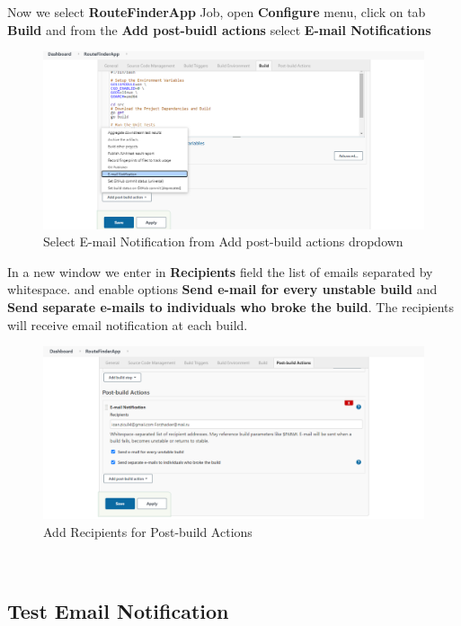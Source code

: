 \documentclass[12pt,a4paper,twoside]{article}
\begin{document}
Now we select \textbf{RouteFinderApp} Job, open \textbf{Configure} menu, click on tab \textbf{Build} and from the \textbf{Add post-buidl actions} select \textbf{E-mail Notifications}


\begin{figure}[H]
    \centering
        \includegraphics[width=15cm]{images-aws/55-email-notification-buil-setting.png}
        \caption{Select E-mail Notification from Add post-build actions dropdown}
\end{figure}


In a new window we enter in \textbf{Recipients} field the list of emails separated by whitespace. and enable options \textbf{Send e-mail for every unstable build} and \textbf{Send separate e-mails to individuals who broke the build}.
The recipients will receive email notification at each build.


\begin{figure}[H]
    \centering
        \includegraphics[width=15cm]{images-aws/56-email-notification-post-build-action.png}
        \caption{Add Recipients for Post-build Actions}
\end{figure}




~\newpage


\subsection{Test Email Notification}
\end{document}
